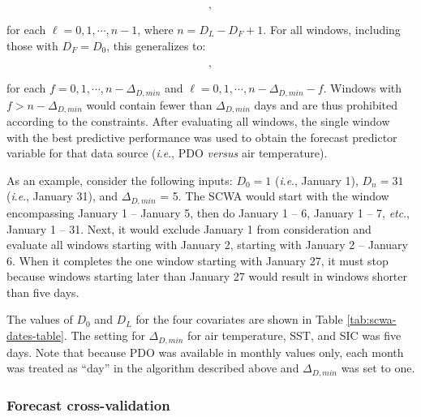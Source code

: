 \documentclass[12pt,]{book}
\theoremstyle{definition}
\theoremstyle{definition}
\theoremstyle{definition}
\theoremstyle{remark}
\begin{document}
\begin{equation}
  [D_0, D_0 + \Delta_{D,min} - 1 + \ell],
\label{eq:scwa-1}
\end{equation}

\noindent
for each \(\ell = 0, 1, \cdots, n - 1\), where \(n = D_L - D_F + 1\).
For all windows, including those with \(D_F = D_0\), this generalizes
to:

\begin{equation}
  [D_0 + f, D_0 + f + \Delta_{D,min} - 1 + \ell],
\label{eq:scwa-2}
\end{equation}

\noindent
for each \(f = 0, 1, \cdots, n - \Delta_{D,min}\) and
\(\ell = 0, 1, \cdots, n - \Delta_{D,min} - f\). Windows with
\(f > n - \Delta_{D,min}\) would contain fewer than \(\Delta_{D,min}\)
days and are thus prohibited according to the constraints. After
evaluating all windows, the single window with the best predictive
performance was used to obtain the forecast predictor variable for that
data source (\emph{i}.\emph{e}., PDO \emph{versus} air temperature).

As an example, consider the following inputs: \(D_0 = 1\)
(\emph{i}.\emph{e}., January 1), \(D_n = 31\) (\emph{i}.\emph{e}.,
January 31), and \(\Delta_{D,min}\) = 5. The SCWA would start with the
window encompassing January 1 -- January 5, then do January 1 -- 6,
January 1 -- 7, \emph{etc}., January 1 -- 31. Next, it would exclude
January 1 from consideration and evaluate all windows starting with
January 2, starting with January 2 -- January 6. When it completes the
one window starting with January 27, it must stop because windows
starting later than January 27 would result in windows shorter than five
days.

The values of \(D_0\) and \(D_L\) for the four covariates are shown in
Table \ref{tab:scwa-dates-table}. The setting for \(\Delta_{D,min}\) for
air temperature, SST, and SIC was five days. Note that because PDO was
available in monthly values only, each month was treated as ``day'' in
the algorithm described above and \(\Delta_{D,min}\) was set to one.

\subsubsection{Forecast cross-validation}\label{fcst-cv}
\end{document}
